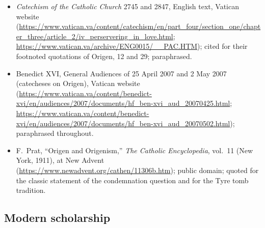 \begin{itemize}
\item \textit{Catechism of the Catholic Church} 2745 and 2847, English
text, Vatican website
(\url{https://www.vatican.va/content/catechism/en/part_four/section_one/chapter_three/article_2/iv_perservering_in_love.html};
\url{https://www.vatican.va/archive/ENG0015/__PAC.HTM}); cited for their
footnoted quotations of Origen,  12 and 29; paraphrased.
\item Benedict XVI, General Audiences of 25 April 2007 and 2 May 2007
(catecheses on Origen), Vatican website
(\url{https://www.vatican.va/content/benedict-xvi/en/audiences/2007/documents/hf_ben-xvi_aud_20070425.html};
\url{https://www.vatican.va/content/benedict-xvi/en/audiences/2007/documents/hf_ben-xvi_aud_20070502.html});
paraphrased throughout.
\item F.~Prat, ``Origen and Origenism,'' \textit{The Catholic
Encyclopedia}, vol.~11 (New York, 1911), at New Advent
(\url{https://www.newadvent.org/cathen/11306b.htm}); public domain; quoted
for the classic statement of the condemnation question and for the Tyre
tomb tradition.
\end{itemize}

\subsection*{Modern scholarship}

